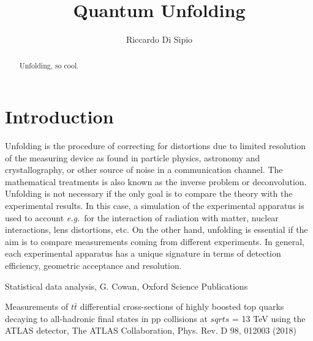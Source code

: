 \documentclass{article}
\begin{document}
\newcommand{\ie}{{\sl i.e.}~}
\newcommand{\eg}{{\sl e.g.}~}


\title{Quantum Unfolding}

\author{Riccardo Di Sipio}

\maketitle


\begin{abstract}
Unfolding, so cool.
\end{abstract}

\section{Introduction}
Unfolding is the procedure of correcting for distortions due to limited resolution of the measuring device\cite{cowan} as found in particle physics\cite{atlas_unf,cms_unf}, astronomy\cite{astro_unf} and crystallography\cite{cryst_unf}, or other source of noise in a communication channel\cite{5g_lte_mimo}. The mathematical treatments is also known as the inverse problem or deconvolution. Unfolding is not necessary if the only goal is to compare the theory with the experimental results. In this case, a simulation of the experimental apparatus is used to account \eg for the interaction of radiation with matter, nuclear interactions, lens distortions, etc. On the other hand, unfolding is essential if the aim is to compare  measurements coming from different experiments. In general, each experimental apparatus has a unique signature in terms of detection efficiency, geometric acceptance and resolution.  

\begin{thebibliography}{99}

 Statistical data analysis, G. Cowan, Oxford Science Publications

 Measurements of $t\bar{t}$ differential cross-sections of highly boosted top quarks decaying to all-hadronic final states in pp collisions at $sqrt{s}$ = 13 TeV using the ATLAS detector, The ATLAS Collaboration, Phys. Rev. D 98, 012003 (2018)





\end{thebibliography}
\end{document}
